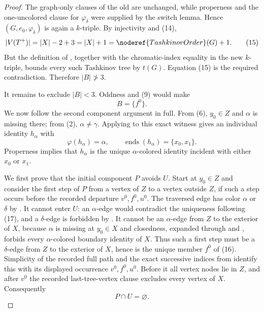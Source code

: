 \begin{proof}
The graph-only clauses of the old  are unchanged, while
properness and the one-uncolored clause for $\varphi_\delta$ were supplied
by the switch lemma.  Hence $(G,e_0,\varphi_\delta)$ is again a
$k$-triple.  By injectivity and (14),
\[
 |V(T^+)|=|X|-2+3=|X|+1=\noderef{TashkinovOrder}(G)+1.        \tag{15}
\]
But the definition of , together with the
chromatic-index equality in the new $k$-triple, bounds every such
Tashkinov tree by $t(G)$.  Equation (15) is the required contradiction.
Therefore $|B|\not>3$.

It remains to exclude $|B|<3$.  Oddness and (9) would make
\[
 B=\{f^0\}.                                                   \tag{16}
\]
We now follow the second component argument in full.  From (6),
$y_0\in Z$ and $\alpha$ is missing there; from (2),
$\alpha\ne\gamma$.  Applying
 to this exact witness gives an
individual identity $h_\alpha$ with
\[
 \varphi(h_\alpha)=\alpha,\qquad
 \operatorname{ends}(h_\alpha)=\{x_0,x_1\}.                 \tag{17}
\]
Properness implies that $h_\alpha$ is the unique $\alpha$-colored
identity incident with either $x_0$ or $x_1$.

We first prove that the initial component $P$ avoids $U$.  Start at
$y_0\in Z$ and consider the first step of $P$ from a vertex of $Z$ to a
vertex outside $Z$, if such a step occurs before the recorded departure
$v^0,f^0,u^0$.  The traversed edge has color $\alpha$ or $\delta$ by
.  It cannot enter $U$: an
$\alpha$-edge would contradict the uniqueness following (17), and a
$\delta$-edge is forbidden by .  It
cannot be an $\alpha$-edge from $Z$ to the exterior of $X$, because
$\alpha$ is missing at $y_0\in X$ and closedness, expanded through
 and , forbids
every $\alpha$-colored boundary identity of $X$.  Thus such a first step
must be a $\delta$-edge from $Z$ to the exterior of $X$, hence is the
unique member $f^0$ of (16).  Simplicity of the recorded full path and
the exact successive indices from  identify
this with its displayed occurrence $v^0,f^0,u^0$.  Before it all vertex
nodes lie in $Z$, and after $v^0$ the recorded last-tree-vertex clause
excludes every vertex of $X$.  Consequently
\[
 P\cap U=\varnothing.                                        \tag{18}
\]


\end{proof}
